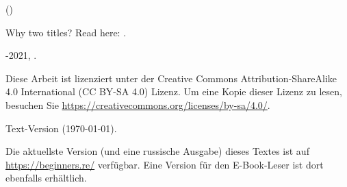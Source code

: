 \begin{titlepage}


\end{titlepage}

\newpage

\begin{center}
\vspace*{\fill}
{\LARGE \TitleMain}

\bigskip

{\large (\TitleAux)}

\bigskip
\bigskip
Why two titles? Read here: . %

\vspace*{\fill}

{\large \AUTHOR}

{\large \TT{\EMAILPRI}}
\vspace*{\fill}
\vfill

\ccbysa

-2021, \AUTHOR. 

Diese Arbeit ist lizenziert unter der Creative Commons Attribution-ShareAlike 4.0 International (CC BY-SA 4.0) Lizenz.
Um eine Kopie dieser Lizenz zu lesen, besuchen Sie \url{https://creativecommons.org/licenses/by-sa/4.0/}.

Text-Version ({\large \today}).

Die aktuellste Version (und eine russische Ausgabe) dieses Textes ist auf \url{https://beginners.re/} verfügbar.
Eine Version für den E-Book-Leser ist dort ebenfalls erhältlich.

\end{center}
